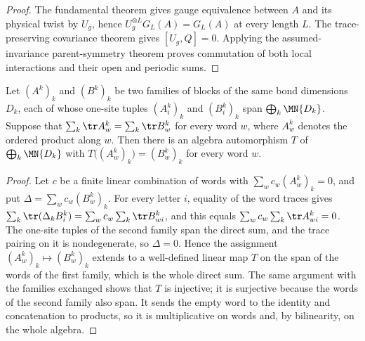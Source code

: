 \begin{proof}
    \leanok
    The fundamental theorem gives gauge equivalence between $A$ and
    its physical twist by $U_g$, hence
    $U_g^{\otimes L}G_L(A)=G_L(A)$ at every length $L$.
    The trace-preserving covariance theorem gives $[U_g,Q]=0$.
    Applying the assumed-invariance parent-symmetry theorem proves
    commutation of both local interactions and their open and periodic sums.
\end{proof}

\begin{lemma}
    \label{lem:block_word_trace_algebra_automorphism}
    \leanok
    Let $(A^k)_k$ and $(B^k)_k$ be two families of blocks of the same bond
    dimensions $D_k$, each of whose one-site tuples $(A^k_i)_k$ and
    $(B^k_i)_k$ span $\bigoplus_k\MN{D_k}$. Suppose that
    $\sum_k\tr A^k_w=\sum_k\tr B^k_w$ for every word $w$, where
    $A^k_w$ denotes the ordered product along $w$. Then there is an
    algebra automorphism $T$ of $\bigoplus_k\MN{D_k}$ with
    $T\bigl((A^k_w)_k\bigr)=(B^k_w)_k$ for every word $w$.
\end{lemma}

\begin{proof}
    \leanok
    Let $c$ be a finite linear combination of words with
    $\sum_wc_w(A^k_w)_k=0$, and put $\Delta=\sum_wc_w(B^k_w)_k$.
    For every letter $i$, equality of the word traces gives
    $\sum_k\tr(\Delta_kB^k_i)=\sum_wc_w\sum_k\tr B^k_{wi}$, and this
    equals $\sum_wc_w\sum_k\tr A^k_{wi}=0$. The one-site tuples of the second
    family span the direct sum, and the trace pairing on it is
    nondegenerate, so $\Delta=0$. Hence the assignment
    $(A^k_w)_k\mapsto(B^k_w)_k$ extends to a well-defined linear map $T$
    on the span of the words of the first family, which is the whole
    direct sum. The same argument with the families exchanged shows that
    $T$ is injective; it is surjective because the words of the second
    family also span. It sends the empty word to the identity and
    concatenation to products, so it is multiplicative on words and,
    by bilinearity, on the whole algebra.
\end{proof}

